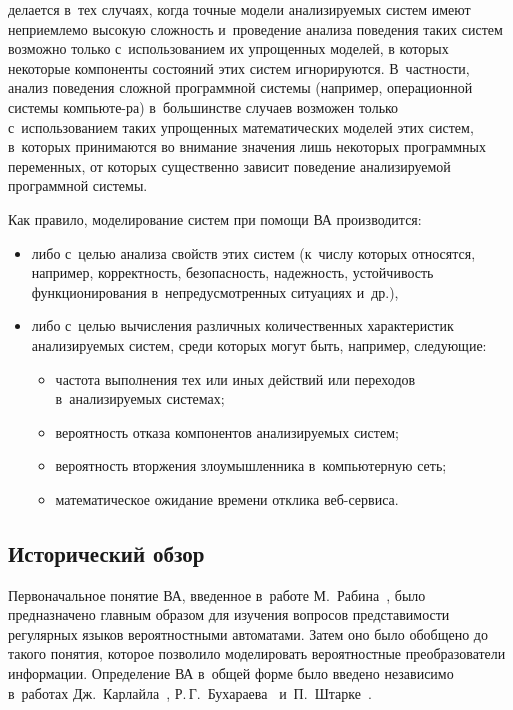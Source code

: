 \begin{multicols}{2}
\begin{enumerate}
делается в~тех случаях, когда точные модели анализируемых сис\-тем
имеют неприемлемо высокую сложность и~проведение анализа поведения
таких сис\-тем возможно только с~использованием их упрощенных моделей,
в которых некоторые компоненты состояний этих сис\-тем  игнорируются.
В~частности, анализ поведения сложной программной сис\-те\-мы (например,
операционной сис\-те\-мы компьюте-\linebreak ра) в~большинстве случаев возможен
только с~использова\-нием таких упрощенных математических моделей этих
сис\-тем, в~которых принимаются во внимание значения лишь некоторых
программных переменных, от которых существен\-но зависит поведение
анализируемой программной сис\-темы.
\end{enumerate}

Как правило, моделирование  сис\-тем при помощи ВА производится:
\begin{itemize}
\item
либо с~целью анализа свойств этих сис\-тем (к~чис\-лу которых относятся,
например, корректность, безопасность, надежность, устойчивость
функционирования в~непредусмотренных ситуациях и~др.),
\item либо с~целью вы\-чис\-ле\-ния различных количественных характеристик
анализируемых сис\-тем, среди которых могут быть, например, следующие:
\begin{itemize}
\item частота выполнения тех или иных действий или переходов в~анализируемых сис\-те\-мах;
\item вероятность отказа компонентов
анализируемых сис\-тем;
\item  вероятность вторжения злоумышленника в~компьютерную сеть;
\item  математическое ожидание времени отклика
веб-сер\-виса.
\end{itemize}
\end{itemize}

\subsection{Исторический обзор}

Первоначальное понятие ВА, введенное в~работе М.~Рабина~\cite{1-mir},
было предназначено главным образом для изучения
вопросов представимости регулярных языков вероятностными автоматами.
Затем оно было обобщено до такого понятия, которое позволило
моделировать вероятностные преобразователи информации. Определение
ВА в~общей форме было введено независимо в~работах Дж.~Карлайла~\cite{4-mir},
Р.\,Г.~Бухараева~\cite{5-mir} и~П.~Штарке~\cite{6-mir}.


\end{multicols}
